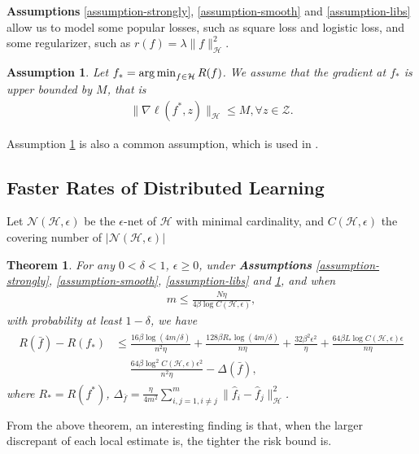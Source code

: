 \documentclass{article}
\newcommand{\argmin}{\operatornamewithlimits{arg\,min}}
\newtheorem{assumption}{Assumption}
\newtheorem{theorem}{Theorem}
\begin{document}
\textbf{Assumptions} \ref{assumption-strongly}, \ref{assumption-smooth} and \ref{assumption-libs} allow us to model some popular losses,
such as square loss and logistic loss, and some regularizer, such as $r(f)=\lambda \|f\|_\mathcal{H}^2$.

\begin{assumption}
\label{assumption-optimal-bound}
  Let $f_\ast=\argmin_{f\in\mathcal{H}}R(f)$. We assume that the gradient at $f_\ast$ is upper bounded by $M$, that is
  \begin{align*}
    \|\nabla \ell(f^\ast,z)\|_\mathcal{H}\leq M, \forall z\in\mathcal{Z}.
  \end{align*}
\end{assumption}
Assumption \ref{assumption-optimal-bound} is also a common assumption, which is used in \cite{Zhang2017er,zhang2012communication}.
\subsection{Faster Rates of Distributed Learning}
Let $\mathcal{N}(\mathcal{H},\epsilon)$ be the $\epsilon$-net of $\mathcal{H}$ with minimal cardinality,
and $C(\mathcal{H},\epsilon)$ the covering number of $|\mathcal{N}(\mathcal{H},\epsilon)|$

\begin{theorem}
\label{theorem-main}
For any $0<\delta<1$, $\epsilon\geq 0$,
under \textbf{Assumptions} \ref{assumption-strongly}, \ref{assumption-smooth}, \ref{assumption-libs} and \ref{assumption-optimal-bound},
and when
  \begin{align}
    \label{equation-12}
    m\leq \frac{N\eta}{4\beta\log C(\mathcal{H},\epsilon)},
  \end{align}
  with probability at least $1-\delta$,
  we have
  \begin{align}
    \label{equation-13}
    \begin{aligned}
    R(\bar{f})-R(f_\ast)&\leq
    \frac{16\beta \log(4m/\delta)}{n^2\eta}+\frac{128\beta R_\ast\log(4m/\delta)}{n\eta}+\frac{32\beta^2\epsilon^2}{\eta}+
    \frac{64\beta L \log C(\mathcal{H},\epsilon)\epsilon}{n\eta}\\
   &~~~~~~\frac{64\beta \log^2C(\mathcal{H},\epsilon)\epsilon^2}{n^2\eta}
   -\Delta(\bar{f}),
  \end{aligned}
  \end{align}
  where $R_\ast=R(f^\ast)$, $\Delta_{\bar{f}}=\frac{\eta}{4m^2}\sum_{i,j=1,i\not=j}^m\|\hat{f}_i-\hat{f}_j\|_\mathcal{H}^2$.
\end{theorem}
From the above theorem, an  interesting finding is that,
when the larger discrepant of each local estimate is,
the tighter the risk bound is.
\end{document}
